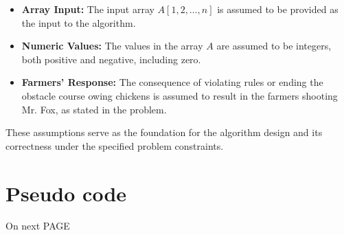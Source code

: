 \documentclass{article}
\begin{document}
\begin{itemize}
    \item \textbf{Array Input:} The input array \(A[1, 2, \ldots, n]\) is assumed to be provided as the input to the algorithm.
    
    \item \textbf{Numeric Values:} The values in the array \(A\) are assumed to be integers, both positive and negative, including zero.
    
    \item \textbf{Farmers' Response:} The consequence of violating rules or ending the obstacle course owing chickens is assumed to result in the farmers shooting Mr. Fox, as stated in the problem.
\end{itemize}

These assumptions serve as the foundation for the algorithm design and its correctness under the specified problem constraints.


\section{Pseudo code}
\begin{center}
\Huge On next PAGE
\end{center}

\vfill
\end{document}
